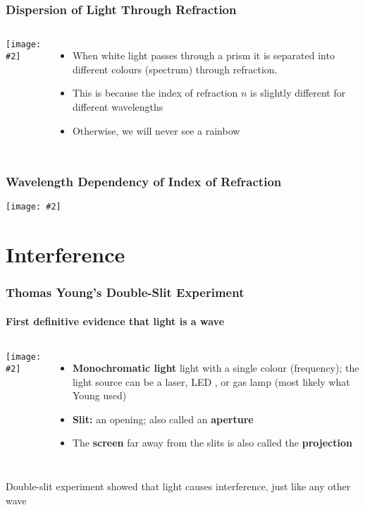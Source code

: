 \documentclass[compress,aspectratio=169]{beamer}
\newcommand{\pic}[2]{\texttt{[image: \#2]}}
\begin{document}
\begin{frame}
  \frametitle{Dispersion of Light Through Refraction}
  \begin{columns}
    \pic{1}{graphics/white-light-split-into-colours-by-a-prism-pasieka.jpg}

    \begin{itemize}
    \item When white light passes through a prism it is separated into
      different colours (spectrum) through refraction.
    \item This is because the index of refraction $n$ is slightly different for
      different wavelengths
    \item Otherwise, we will never see a rainbow
    \end{itemize}
  \end{columns}
\end{frame}



\begin{frame}
  \frametitle{Wavelength Dependency of Index of Refraction}
  \begin{center}
    \pic{.5}{graphics/Dispersion-curve.png}
  \end{center}
\end{frame}



\section{Interference}

\begin{frame}
  \frametitle{Thomas Young's Double-Slit Experiment}
  \framesubtitle{First definitive evidence that light is a wave}
  \begin{columns}
    \pic{1}{graphics/double-slit1.png}
    \begin{itemize}
    \item\textbf{Monochromatic light} light with a single colour (frequency);
      the light source can be a laser, LED , or gas lamp (most likely what Young
      used)
    \item\textbf{Slit:} an opening; also called an \textbf{aperture}
    \item The \textbf{screen} far away from the slits is also called the
      \textbf{projection}
    \end{itemize}
  \end{columns}

  \vspace{.15in}Double-slit experiment showed that light causes interference,
  just like any other wave
\end{frame}
\end{document}
